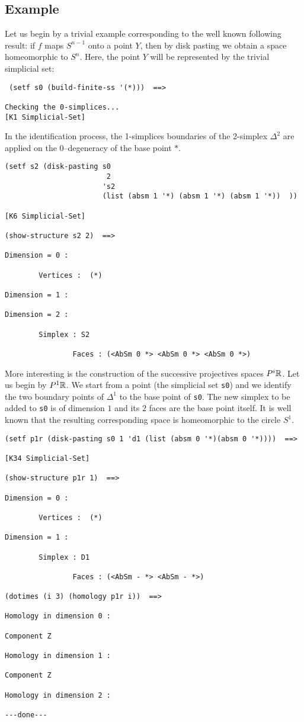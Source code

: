 \newpage

\subsection* {Example}

Let us begin by a trivial example corresponding to the well known following result:
if $f$ maps $S^{n-1}$ onto a point $Y$, then by disk pasting we obtain a space homeomorphic to $S^n$.
Here, the point $Y$ will be represented by the trivial simplicial set:

{\footnotesize\begin{verbatim}
 (setf s0 (build-finite-ss '(*)))  ==>

Checking the 0-simplices...
[K1 Simplicial-Set]
\end{verbatim}}
In the identification process, the 1-simplices boundaries of the 2-simplex $\Delta^2$
are applied on the 0--degeneracy of the base point $*$.
{\footnotesize\begin{verbatim}
(setf s2 (disk-pasting s0
                        2
                       's2
                       (list (absm 1 '*) (absm 1 '*) (absm 1 '*))  ))

[K6 Simplicial-Set]

(show-structure s2 2)  ==>

Dimension = 0 :

        Vertices :  (*)

Dimension = 1 :

Dimension = 2 :

        Simplex : S2

                Faces : (<AbSm 0 *> <AbSm 0 *> <AbSm 0 *>)
\end{verbatim}}
More interesting is the construction of the successive projectives spaces
$P^i{{\mathbb{R}}}$. Let us begin by $P^1{{\mathbb{R}}}$. We start from a point (the simplicial set {\tt s0})
and we identify the two boundary
points of $\Delta^1$ to the base point of {\tt s0}. The new simplex to be added to {\tt s0}
is of dimension $1$ and its $2$ faces  are the base point itself. It is well known that
the resulting corresponding  space is homeomorphic to the circle $S^1$.
{\footnotesize\begin{verbatim}
(setf p1r (disk-pasting s0 1 'd1 (list (absm 0 '*)(absm 0 '*))))  ==>

[K34 Simplicial-Set]

(show-structure p1r 1)  ==>

Dimension = 0 :

        Vertices :  (*)

Dimension = 1 :

        Simplex : D1

                Faces : (<AbSm - *> <AbSm - *>)

(dotimes (i 3) (homology p1r i))  ==>

Homology in dimension 0 :

Component Z

Homology in dimension 1 :

Component Z

Homology in dimension 2 :

---done---
\end{verbatim} }


